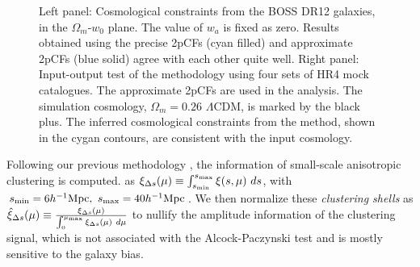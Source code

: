 \documentclass[iop]{emulateapj}
\begin{document}
\begin{figure}
   \caption{\label{fig_Check}
 Left panel: Cosmological constraints from the BOSS DR12 galaxies, in the $\Omega_m$-$w_0$ plane. 
 The value of $w_a$ is fixed as zero.
 Results obtained using the precise 2pCFs (cyan filled) 
 and approximate 2pCFs (blue solid) agree with each other quite well.
 Right panel: Input-output test of the methodology using four sets of HR4 mock catalogues.
 The approximate 2pCFs are used in the analysis.
 The simulation cosmology, $\Omega_m=0.26$ $\Lambda$CDM, is marked by the black plus.
 The inferred cosmological constraints from the method, shown in the cygan contours, are consistent with the input cosmology.
   }
\end{figure}


Following our previous methodology \citep{Li2016}, the information of small-scale anisotropic clustering is computed.
as $\xi_{\Delta s} (\mu) \equiv \int_{s_{\rm min}}^{s_{\rm max}} \xi (s,\mu)\ ds$, 
with $s_{\rm min}=6 h^{-1} {\rm Mpc},\ s_{\rm max}=40 h^{-1} {\rm Mpc}$.
We then normalize these {\em clustering shells} as 
$\hat\xi_{\Delta s}(\mu) \equiv \frac{\xi_{\Delta s}(\mu)}{\int_{0}^{\mu_{\rm max}}\xi_{\Delta s}(\mu)\ d\mu}$
to nullify the amplitude information of the clustering signal, 
which is not associated with the Alcock-Paczynski test and is mostly sensitive to the galaxy bias.
\end{document}
